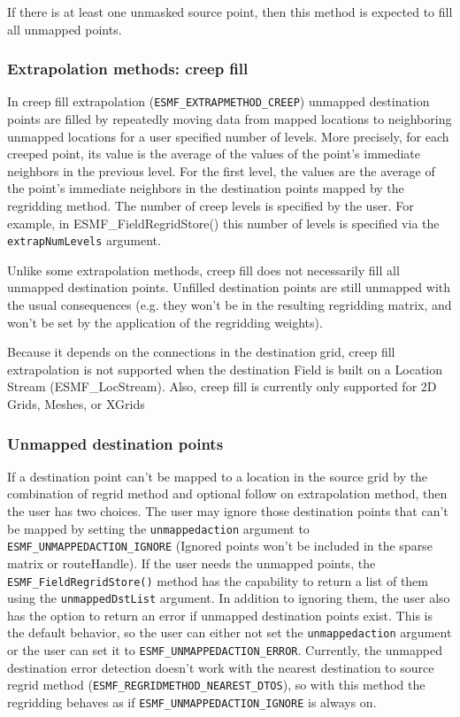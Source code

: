 If there is at least one unmasked source point, then this method is expected to fill all unmapped points. 

\subsubsection{Extrapolation methods: creep fill}\label{sec:extrapolation:creep}
In creep fill extrapolation ({\tt ESMF\_EXTRAPMETHOD\_CREEP}) unmapped destination points are filled by 
repeatedly moving data from mapped locations to neighboring unmapped locations for a user specified 
number of levels. More precisely, for each creeped point, its value is the average of the values of the 
point's immediate neighbors in the previous level. For the first level, the values are the average of the 
point's immediate neighbors in the destination points mapped by the regridding method. The number of creep levels
is specified by the user. For example, in ESMF\_FieldRegridStore() this number of levels is specified 
via the {\tt extrapNumLevels} argument. 

Unlike some extrapolation methods, creep fill does not necessarily 
fill all unmapped destination points. Unfilled destination points are still unmapped with the usual 
consequences (e.g. they won't be in the resulting regridding matrix, and won't be set by the application 
of the regridding weights).

Because it depends on the connections in the destination grid, creep fill extrapolation is not supported when the 
destination Field is built on a Location Stream (ESMF\_LocStream). Also, creep fill is currently only supported for 
2D Grids, Meshes, or XGrids

\subsubsection{Unmapped destination points}
 If a destination point can't be mapped to a location in the source grid by the combination of regrid method and 
 optional follow on extrapolation method, then the user has two choices. The user may ignore those destination points
 that can't be mapped by setting the {\tt unmappedaction} argument to {\tt ESMF\_UNMAPPEDACTION\_IGNORE} (Ignored points won't be included in
 the sparse matrix or routeHandle). If the user needs the unmapped points, the {\tt ESMF\_FieldRegridStore()} method has the capability to return
 a list of them using the {\tt unmappedDstList} argument.  In addition to ignoring them, the user also has the option to return
 an error if unmapped destination points exist. This is the default behavior, so the user can either not set the {\tt unmappedaction} argument
 or the user can set it to {\tt ESMF\_UNMAPPEDACTION\_ERROR}. Currently, the unmapped destination error detection doesn't 
 work with the nearest destination to source regrid method ({\tt ESMF\_REGRIDMETHOD\_NEAREST\_DTOS}), so with this method the regridding 
 behaves as if {\tt ESMF\_UNMAPPEDACTION\_IGNORE} is always on. 


